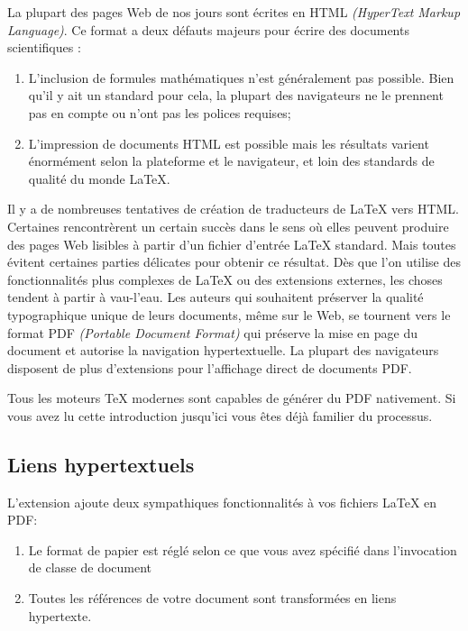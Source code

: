 La plupart des pages Web de nos jours sont écrites en HTML
\emph{(HyperText Markup Language)}. Ce format a deux défauts majeurs
pour écrire des documents scientifiques :
\begin{enumerate}
\item L'inclusion de formules mathématiques n'est généralement pas
  possible. Bien qu'il y ait un standard pour cela, la plupart des
  navigateurs ne le prennent pas en compte ou n'ont pas les polices
  requises;
\item L'impression de documents HTML est possible mais les résultats
  varient énormément selon la plateforme et le navigateur, et loin des
  standards de qualité du monde \LaTeX{}.
\end{enumerate}

Il y a de nombreuses tentatives de création de traducteurs de \LaTeX{}
vers HTML. Certaines rencontrèrent un certain succès dans le sens où
elles peuvent produire des pages Web lisibles à partir d'un fichier
d'entrée \LaTeX{} standard. Mais toutes évitent certaines parties
délicates pour obtenir ce résultat. Dès que l'on utilise des
fonctionnalités plus complexes de \LaTeX{} ou des extensions externes,
les choses tendent à partir à vau-l'eau. Les auteurs qui souhaitent
préserver la qualité typographique unique de leurs documents, même sur
le Web, se tournent vers le format PDF \emph{(Portable Document
  Format)} qui préserve la mise en page du document et autorise la
navigation hypertextuelle. La plupart des navigateurs disposent de
plus d'extensions pour l'affichage direct de documents PDF.

Tous les moteurs \TeX{} modernes sont capables de générer du PDF
nativement. Si vous avez lu cette introduction jusqu'ici vous êtes
déjà familier du processus.

\subsection{Liens hypertextuels}
\label{ssec:pdfhyperref}

L'extension  ajoute deux sympathiques fonctionnalités à
vos fichiers \LaTeX{} en PDF:

\begin{enumerate}
\item Le format de papier est réglé selon ce que vous avez spécifié
  dans l'invocation de classe de document
\item Toutes les références de votre document sont transformées en
  liens hypertexte.
\end{enumerate}

